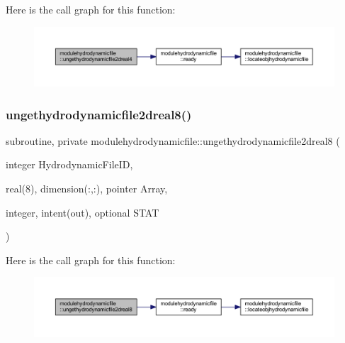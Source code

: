 Here is the call graph for this function\+:\nopagebreak
\begin{figure}[H]
\begin{center}
\leavevmode
\includegraphics[width=350pt]{namespacemodulehydrodynamicfile_a7f6d7c818b2355e29070b78957b71133_cgraph}
\end{center}
\end{figure}
\mbox{\label{namespacemodulehydrodynamicfile_a419f36beda63ccf38170844806ddd74c}} 
\subsubsection{\texorpdfstring{ungethydrodynamicfile2dreal8()}{ungethydrodynamicfile2dreal8()}}
{\footnotesize\ttfamily subroutine, private modulehydrodynamicfile\+::ungethydrodynamicfile2dreal8 (\begin{DoxyParamCaption}\item[{integer}]{Hydrodynamic\+File\+ID,  }\item[{real(8), dimension(\+:,\+:), pointer}]{Array,  }\item[{integer, intent(out), optional}]{S\+T\+AT }\end{DoxyParamCaption})\hspace{0.3cm}{\ttfamily [private]}}

Here is the call graph for this function\+:\nopagebreak
\begin{figure}[H]
\begin{center}
\leavevmode
\includegraphics[width=350pt]{namespacemodulehydrodynamicfile_a419f36beda63ccf38170844806ddd74c_cgraph}
\end{center}
\end{figure}
\mbox{\label{namespacemodulehydrodynamicfile_ac5cff7872d6994174eb551c203e0e56a}} 
